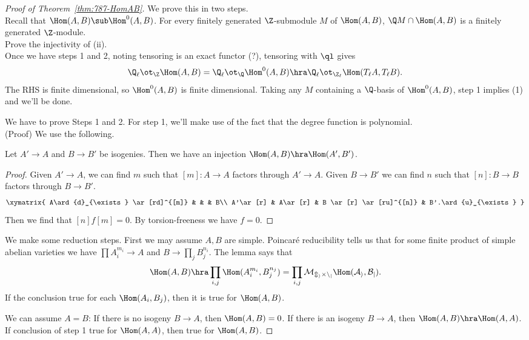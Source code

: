 \begin{proof}[Proof of Theorem~\ref{thm:787-HomAB}]
We prove this in two steps.\\

 Recall that $\Hom(A,B)\sub \Hom^0(A,B)$. For every finitely generated $\Z$-submodule $M$ of $\Hom(A,B)$, $\Q M\cap \Hom(A,B)$ is a finitely generated $\Z$-module.\\

 Prove the injectivity of (ii). \\

Once we have steps 1 and 2, noting tensoring is an exact functor (?), tensoring with $\ql$ gives
\[
\Q_{\ell}\ot_{\Z} \Hom(A,B)=\Q_{\ell} \ot_{\Q} \Hom^0(A,B) \hra \Q_{\ell}\ot_{\Z_{\ell}} \Hom(T_{\ell}A, T_{\ell}B).
\]
The RHS is finite dimensional, so $\Hom^0(A,B)$ is finite dimensional. Taking any $M$ containing a $\Q$-basis of $\Hom^0(A,B)$, step 1 implies (1) and we'll be done.

We have to prove Steps 1 and 2. For step 1, we'll make use of the fact that the degree function is polynomial.\\

 (Proof) We use the following.
\begin{lem}
Let $A'\to A$ and $B\to B'$ be isogenies. Then we have an injection $\Hom(A,B)\hra \Hom(A',B')$.
\end{lem}
\begin{proof}
Given $A'\to A$, we can find $m$ such that $[m]:A\to A$ factors through $A'\to A$. Given $B\to B'$ we can find $n$ such that $[n]:B\to B$ factors through $B\to B'$.
\[
\xymatrix{
A\ard{d}_{\exists} \ar[rd]^{[m]} & & & B\\
A'\ar[r] & A\ar[r] & B \ar[r] \ar[ru]^{[n]} & B'.\ard{u}_{\exists}
}
\]
Then we find that $[n]f[m]=0$. By torsion-freeness we have $f=0$.
\end{proof}

We make some reduction steps. First we may assume $A,B$ are simple. Poincar\'e reducibility tells us that for some finite product of simple abelian varieties we have $\prod A_i^{m_i}\to A$ and $B\to \prod_j B_j^{n_i}$. The lemma says that 
\[
\Hom(A,B)\hra \prod_{i,j}\Hom(A_i^{m_i},B_j^{n_j})=\prod_{i,j}\cal M_{m_i\times n_j}\Hom(A_i,B_j).
\]
If the conclusion true for each $\Hom(A_i,B_j)$, then it is true for $\Hom(A,B)$.

We can assume $A=B$: If there is no isogeny $B\to A$, then $\Hom(A,B)=0$. If there is an isogeny $B\to A$, then $\Hom(A,B)\hra \Hom(A,A)$. If conclusion of step 1 true for $\Hom(A,A)$, then true for $\Hom(A,B)$.


\end{proof}
